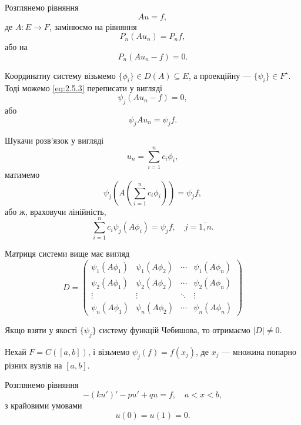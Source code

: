 Розглянемо рівняння
\begin{equation}
    \label{eq:2.5.1}
    A u = f,
\end{equation}
де $A: E \to F$, замінюємо на рівняння
\begin{equation}
    \label{eq:2.5.2}
    P_n(Au_n) = P_n f,
\end{equation}
або на
\begin{equation}
    \label{eq:2.5.3}
    P_n(Au_n - f) = 0.
\end{equation}

Координатну систему візьмемо $\{\phi_i\} \in D(A) \subseteq E$, а проекційну --- $\{\psi_i\}\in F^\star$. Тоді можемо \eqref{eq:2.5.3} переписати у вигляді \[\psi_j(Au_n - f) = 0,\] або \[\psi_j Au_n = \psi_j f.\]

Шукачи розв'язок у вигляді \[u_n = \sum_{i = 1}^n c_i \phi_i,\] матимемо \[ \psi_j \left( A \left( \sum_{i = 1}^n c_i \phi_i \right) \right) = \psi_j f, \] або ж, враховучи лінійність,
\begin{equation}
    \label{eq:2.5.4}
    \sum_{i = 1}^n c_i \psi_j \left( A \phi_i \right) = \psi_j f, \quad j = \overline{1,n}.
\end{equation}

Матриця системи вище має вигляд
\begin{equation}
    \label{eq:2.5.5}
    D = \begin{pmatrix}
        \psi_1(A\phi_1) & \psi_1(A\phi_2) & \cdots & \psi_1(A\phi_n) \\
        \psi_2(A\phi_1) & \psi_2(A\phi_2) & \cdots & \psi_2(A\phi_n) \\
        \vdots & \vdots & \ddots & \vdots \\
        \psi_n(A\phi_1) & \psi_n(A\phi_2) & \cdots & \psi_n(A\phi_n)
    \end{pmatrix}
\end{equation}

Якщо взяти у якості $\{\psi_j\}$ систему функцій Чебишова, то отримаємо $|D| \ne 0$.

\begin{example}
    Нехай $F = C([a,b])$, і візьмемо $\psi_j(f) = f(x_j)$, де $x_j$ --- множина попарно різних вузлів на $[a,b]$.
\end{example}

\begin{example}
    Розглянемо рівняння \[-(ku')' - pu' + qu = f, \quad a < x < b,\] з крайовими умовами \[u(0) = u(1) = 0.\]
\end{example}

